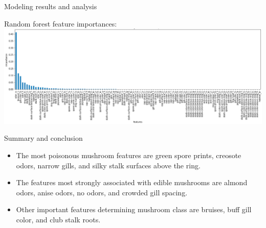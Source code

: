 \documentclass{beamer}
\begin{document}
\begin{frame}{Modeling results and analysis}
\begin{center}
Random forest feature importances:
\includegraphics[scale=0.3]{random-forest-mushrooms}
\end{center}
\end{frame}

\begin{frame}{Summary and conclusion}
\begin{itemize}
\item The most poisonous mushroom features are green spore prints,
creosote odors, narrow gills, and silky stalk surfaces above the ring.

\item The features most strongly associated with edible mushrooms are almond
odors, anise odors, no odors, and crowded gill spacing.

\item Other important features determining mushroom class are bruises, buff gill
color, and club stalk roots.
\end{itemize}
\end{frame}
\end{document}
